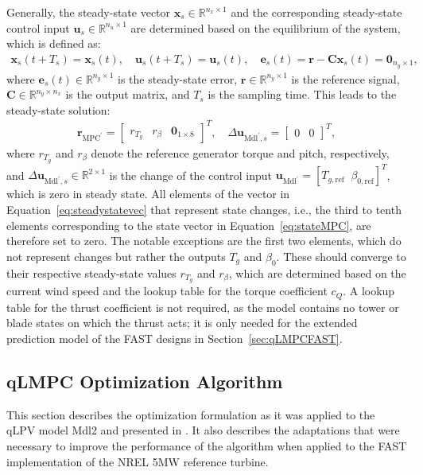 Generally, the steady-state vector $\bm{x}_{s} \in \mathbb{R}^{n_x \times 1}$ and the corresponding steady-state control input $\bm{u}_{s} \in \mathbb{R}^{n_u \times 1}$ are determined based on the equilibrium of the system, which is defined as:
\begin{align*}
    \bm{x}_{s}(t + T_s) = \bm{x}_{s}(t),  \quad \bm{u}_{s}(t + T_s) = \bm{u}_{s}(t), \quad
    \bm{e}_s(t) = \bm{r} - \bm{C} \bm{x}_{s}(t) = \bm{0}_{n_y \times 1},
\end{align*}
%
where $\bm{e}_s(t) \in \mathbb{R}^{n_y \times 1}$ is the steady-state error, $\bm{r} \in \mathbb{R}^{n_y \times 1}$ is the reference signal, $\bm{C} \in \mathbb{R}^{n_y \times n_x}$ is the output matrix, and $T_s$ is the sampling time. This leads to the steady-state solution:
\begin{align} \label{eq:steadystatevec}
    \bm{r}_{\text{MPC}^\prime} = \begin{bmatrix} r_{T_g} & r_{\beta} & \bm{0}_{1 \times 8} \end{bmatrix}^T, \quad
    \Delta\bm{u}_{\text{Mdl}^\prime\!,s} = \begin{bmatrix} 0 & 0 \end{bmatrix}^T,
\end{align}
where \(r_{T_g}\) and \(r_{\beta}\) denote the reference generator torque and pitch, respectively, and $\Delta\bm{u}_{\text{Mdl}^\prime,s} \in \mathbb{R}^{2 \times 1}$ is the change of the control input $\bm{u}_{\text{Mdl}^\prime} = [T_{g,\text{ref}} \;\; \beta_{0,\text{ref}}]^T$, which is zero in steady state. All elements of the vector in Equation~\eqref{eq:steadystatevec} that represent state changes, i.e., the third to tenth elements corresponding to the state vector in Equation~\eqref{eq:stateMPC}, are therefore set to zero.
The notable exceptions are the first two elements, which do not represent changes but rather the outputs \( T_g \) and \( \beta_0 \). These should converge to their respective steady-state values \( r_{T_g} \) and \( r_{\beta} \), which are determined based on the current wind speed and the lookup table for the torque coefficient $c_Q$. A lookup table for the thrust coefficient is not required, as the model contains no tower or blade states on which the thrust acts; it is only needed for the extended prediction model of the FAST designs in Section~\ref{sec:qLMPCFAST}.

\subsection{qLMPC Optimization Algorithm}\label{sec:qLMPCOptimizationAlgo}
This section describes the optimization formulation as it was applied to the qLPV model Mdl2 and presented in \cite{dittmer2021velocity}. It also describes the adaptations that were necessary to improve the performance of the algorithm when applied to the FAST implementation of the NREL 5MW reference turbine.


